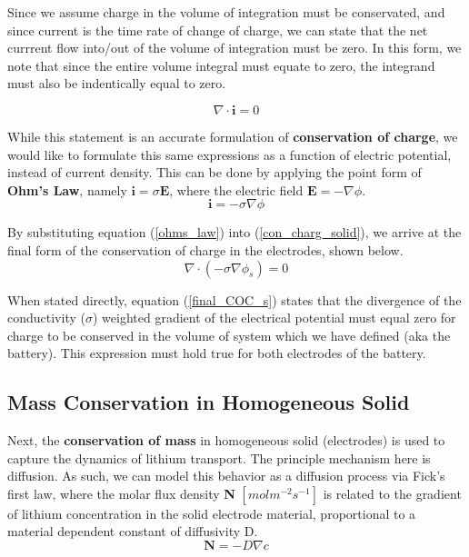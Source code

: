 \documentclass[lettersize,journal]{IEEEtran}
\begin{document}
\noindent Since we assume charge in the volume of integration must be conservated, and since current is the time rate of change of charge, we can state that the net currrent flow into/out of the volume of integration must be zero.  In this form, we note that since the entire volume integral must equate to zero, the integrand must also be indentically equal to zero.

\begin{equation} \label{con_charg_solid}
    \nabla \cdot \textbf{i} = 0
\end{equation}

While this statement is an accurate formulation of \textbf{conservation of charge}, we would like to formulate this same expressions as a function of electric potential, instead of current density. This can be done by applying the point form of \textbf{Ohm's Law}, namely $\textbf{i} = \sigma\textbf{E}$, where the electric field $\textbf{E} = -\nabla \phi$.
\begin{equation} \label{ohms_law}
  \textbf{i} = -\sigma \nabla \phi
\end{equation}

\noindent By substituting equation (\ref{ohms_law}) into (\ref{con_charg_solid}), we arrive at the final form of the conservation of charge in the electrodes, shown below.
\begin{equation} \label{final_COC_s}
  \nabla \cdot (-\sigma \nabla \phi_s) = 0
\end{equation}

When stated directly, equation (\ref{final_COC_s}) states that the divergence of the conductivity ($\sigma$) weighted gradient of the electrical potential must equal zero for charge to be conserved in the volume of system which we have defined (aka the battery). This expression must hold true for both electrodes of the battery.

\subsection{Mass Conservation in Homogeneous Solid}

Next, the \textbf{conservation of mass} in homogeneous solid (electrodes) is used to capture the dynamics of lithium transport. The principle mechanism here is diffusion. As such, we can model this behavior as a diffusion process via Fick's first law, where the molar flux density \textbf{N} $[mol m^{-2} s^{-1}]$ is related to the gradient of lithium concentration in the solid electrode material, proportional to a material dependent constant of diffusivity D.
\begin{equation}\label{ficks_first}
    \textbf{N} =  -D \nabla c
\end{equation}
\end{document}
